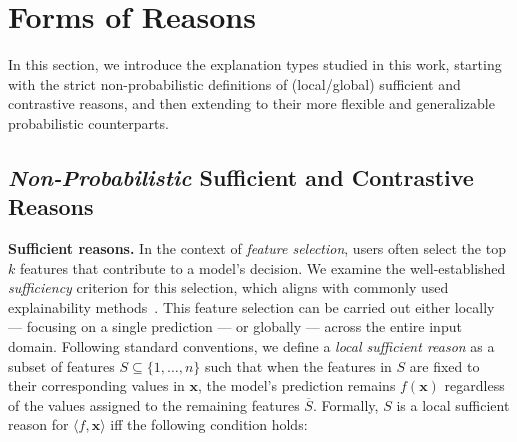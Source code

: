 \documentclass{article}
\newcommand{\x}{\textbf{x}}
\begin{document}




\section{Forms of Reasons}

In this section, we introduce the explanation types studied in this work, starting with the strict non-probabilistic definitions of (local/global) sufficient and contrastive reasons, and then extending to their more flexible and generalizable probabilistic counterparts.



\subsection{\emph{Non-Probabilistic} Sufficient and Contrastive Reasons}

\textbf{Sufficient reasons.} In the context of \emph{feature selection}, users often select the top $k$ features that contribute to a model's decision. We examine the well-established \emph{sufficiency} criterion for this selection, which aligns with commonly used explainability methods~\citep{ribeiro2018anchors, carter2019made, ignatiev2019abduction, dasgupta2022framework}. This feature selection can be carried out either locally --- focusing on a single prediction --- or globally --- across the entire input domain. Following standard conventions, we define a \emph{local sufficient reason} as a subset of features $S\subseteq \{1,\ldots,n\}$ such that when the features in $S$ are fixed to their corresponding values in $\x$, the model's prediction remains $f(\x)$ regardless of the values assigned to the remaining features $\overline{S}$. Formally, $S$ is a local sufficient reason for $\langle f,\x\rangle$ iff the following condition holds:
\end{document}
